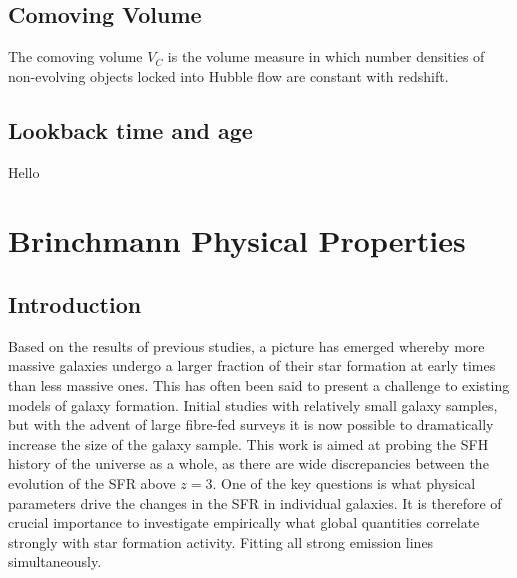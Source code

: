 \documentclass{literature}
\begin{document}
\subsection{Comoving Volume}\label{subs:Comoving Volume}
The comoving volume $V_{C}$ is the volume measure in which number densities of non-evolving objects locked into Hubble flow are constant with redshift.

\subsection{Lookback time and age}\label{subs:lookback time}
Hello



\section{Brinchmann Physical Properties}\label{sec:Brinchmann_properties}
\subsection{Introduction}
Based on the results of previous studies, a picture has emerged whereby more massive galaxies undergo a larger fraction of their star formation at early times than less massive ones. This has often been said to present a challenge to existing models of galaxy formation. Initial studies with relatively small galaxy samples, but with the advent of large fibre-fed surveys it is now possible to dramatically increase the size of the galaxy sample. This work is aimed at probing the SFH history of the universe as a whole, as there are wide discrepancies between the evolution of the SFR above $z = 3$. One of the key questions is what physical parameters drive the changes in the SFR in individual galaxies. It is therefore of crucial importance to investigate empirically what global quantities correlate strongly with star formation activity. Fitting all strong emission lines simultaneously. 




\review
\label{background-review}

\progress
\label{progress}

\summary
\label{summary}

\end{document}
